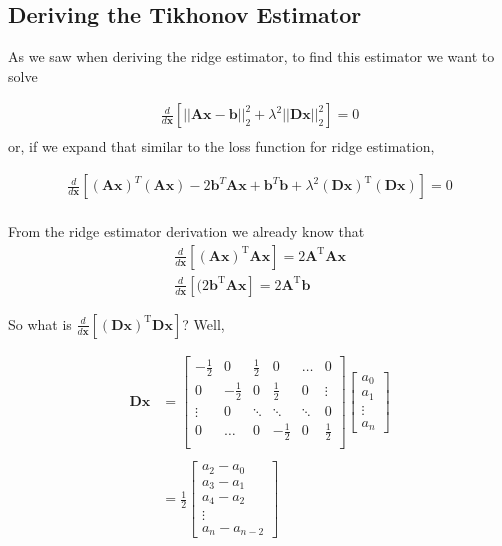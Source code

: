 \documentclass{article}
\newcommand{\x}{\mathbf{x}}
\newcommand{\A}{\mathbf{A}}
\newcommand{\B}{\mathbf{b}} %
\newcommand{\D}{\mathbf{D}}
\begin{document}
\subsection{Deriving the Tikhonov Estimator}

As we saw when deriving the ridge estimator, to find this estimator we want to solve

\begin{align*}
\frac{d}{d\x} \left[ ||\A\x-\B||_{2}^{2} + \lambda^2||\D \x||_{2}^{2} \right] = 0 \\
\end{align*}
or, if we expand that similar to the loss function for ridge estimation, 

\begin{align*}
\frac{d}{d\x} \left[ (\A\x)^T(\A\x) -2 \B^T \A\x + \B^T \B + \lambda^2(\D\x)^{\textrm{T}}(\D\x) \right] = 0 \\
\end{align*}

From the ridge estimator derivation we already know that 
\begin{align*}
\frac{d}{d\x} [ (\A\x)^{\textrm{T}} \A\x ] = 2\A^{\textrm{T}}\A\x \\
\frac{d}{d\x} [ (2\B^{\textrm{T}} \A\x ] = 2\A^{\textrm{T}}\B
\end{align*}

So what is $\frac{d}{d\x} [ (\D\x)^{\textrm{T}}\D\x ] $? Well, 

\begin{align*}
  \D\x &= \begin{bmatrix}
    -\frac{1}{2} & 0 & \frac{1}{2} & 0 & \dots & 0 \\
    0 & -\frac{1}{2} & 0 & \frac{1}{2} & 0 & \vdots \\
    \vdots & 0 & \ddots & \ddots & \ddots & 0 \\
    0 & \dots & 0 & -\frac{1}{2} & 0 & \frac{1}{2} \\ 
  \end{bmatrix} 
  \begin{bmatrix}
  a_0 \\
  a_1 \\
  \vdots \\
  a_n
  \end{bmatrix} \\\\
  &= \frac{1}{2}\begin{bmatrix}
  a_2 - a_0 \\ 
  a_3 - a_1 \\ 
  a_4 - a_2 \\
  \vdots \\
  a_n - a_{n-2}
  \end{bmatrix}
\end{align*}
\end{document}
